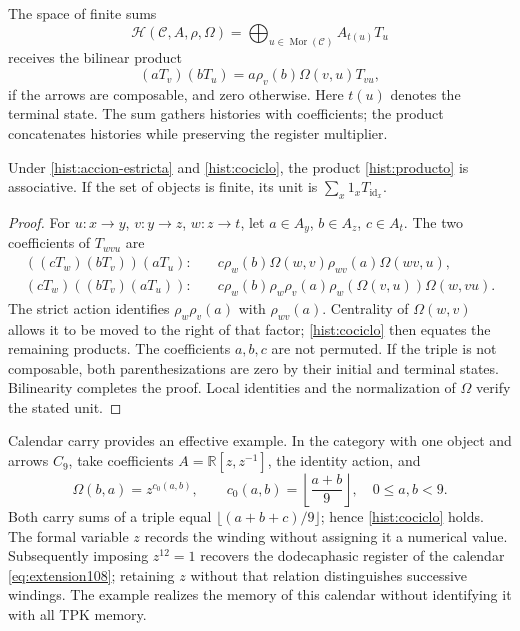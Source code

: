 The space of finite sums
\[
 \mathcal H(\mathcal C,A,\rho,\Omega)
   =\bigoplus_{u\in\operatorname{Mor}(\mathcal C)} A_{t(u)}T_u
\]
receives the bilinear product
\begin{equation}
 (aT_v)(bT_u)=a\rho_v(b)\Omega(v,u)T_{vu},
 \label{hist:producto}
\end{equation}
if the arrows are composable, and zero otherwise. Here \(t(u)\)
denotes the terminal state. The sum gathers histories with coefficients; the
product concatenates histories while preserving the register multiplier.

\begin{proposition}
Under \eqref{hist:accion-estricta} and \eqref{hist:cociclo}, the product
\eqref{hist:producto} is associative. If the set of objects is finite,
its unit is \(\sum_x1_xT_{\operatorname{id}_x}\).
\end{proposition}
\begin{proof}
For \(u:x\to y\), \(v:y\to z\), \(w:z\to t\), let
\(a\in A_y\), \(b\in A_z\), \(c\in A_t\). The two coefficients
of \(T_{wvu}\) are
\begin{align*}
 ((cT_w)(bT_v))(aT_u):\quad&
 c\rho_w(b)\Omega(w,v)\rho_{wv}(a)\Omega(wv,u),\\
 (cT_w)((bT_v)(aT_u)):\quad&
 c\rho_w(b)\rho_w\rho_v(a)\rho_w(\Omega(v,u))\Omega(w,vu).
\end{align*}
The strict action identifies \(\rho_w\rho_v(a)\) with \(\rho_{wv}(a)\).
Centrality of \(\Omega(w,v)\) allows it to be moved to the right of
that factor; \eqref{hist:cociclo} then equates the remaining products.
The coefficients \(a,b,c\) are not permuted. If the triple is not composable,
both parenthesizations are zero by their initial and terminal states.
Bilinearity completes the proof. Local identities and the
normalization of \(\Omega\) verify the stated unit.
\end{proof}

Calendar carry provides an effective example. In the category
with one object and arrows \(C_9\), take coefficients
\(A=\mathbb R[z,z^{-1}]\), the identity action, and
\[
 \Omega(b,a)=z^{c_0(a,b)},\qquad
 c_0(a,b)=\left\lfloor\frac{a+b}{9}\right\rfloor,
 \quad 0\leq a,b<9.
\]
Both carry sums of a triple equal
\(\lfloor(a+b+c)/9\rfloor\); hence
\eqref{hist:cociclo} holds. The formal variable \(z\) records the winding without
assigning it a numerical value. Subsequently imposing \(z^{12}=1\) recovers the
dodecaphasic register of the calendar \eqref{eq:extension108}; retaining
\(z\) without that relation distinguishes successive windings. The example realizes
the memory of this calendar without identifying it with all TPK
memory.

